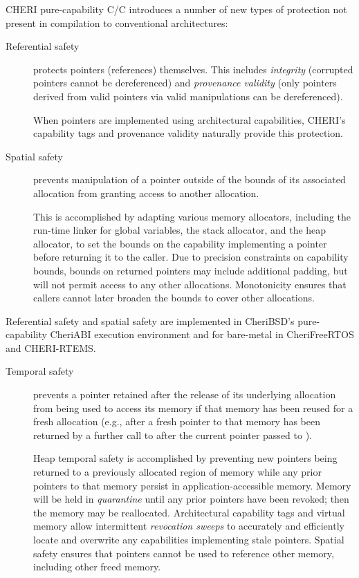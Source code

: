 \documentclass[12pt,twoside,openright,usletter]{article}
\newcommand{\ccode}[1]{{\small\ttfamily{#1}}}
\newcommand{\cfunc}[1]{{\ccode{#1()}}}
\newcommand*{\cpp}[1][]{C\textsmaller[2]{\nolinebreak[4]\hspace{-.05em}\raisebox{.45ex}{\textbf{++}}}}
\newcommand*{\purecapCOrCpp}[1]{CHERI pure-capability C/\cpp{}}
\begin{document}
\purecapCOrCpp{} introduces a number of new types of protection not
present in compilation to conventional architectures:

\begin{description}
\item[Referential safety] protects pointers (references) themselves.
  This includes \textit{integrity} (corrupted pointers cannot be dereferenced)
  and \textit{provenance validity} (only pointers derived from valid pointers
  via valid manipulations can be dereferenced).

  When pointers are implemented using architectural capabilities, CHERI's
  capability tags and provenance validity naturally provide this protection.

\item[Spatial safety] prevents manipulation of a pointer outside of the bounds
  of its associated allocation from granting access to another allocation.

  This is accomplished by adapting various memory allocators, including the run-time
  linker for global variables, the stack allocator, and the heap allocator,
  to set the bounds on the capability implementing a pointer before returning
  it to the caller.
  Due to precision constraints on capability bounds, bounds on returned
  pointers may include additional padding, but will not permit access to any
  other allocations.
  Monotonicity ensures that callers cannot later broaden the bounds to cover
  other allocations.
\end{description}

\noindent
Referential safety and spatial safety are implemented in CheriBSD's
pure-capability CheriABI execution environment and for bare-metal in
CheriFreeRTOS and CHERI-RTEMS.

\begin{description}
\item[Temporal safety] prevents a pointer retained after the release of its
  underlying allocation from being used to access its memory if that memory
  has been reused for a fresh allocation (e.g., after a fresh pointer to that
  memory has been returned by a further call to \cfunc{malloc} after the
  current pointer passed to \cfunc{free}).

  Heap temporal safety is accomplished by preventing new pointers being
  returned to a previously allocated region of memory while any prior pointers
  to that memory persist in application-accessible memory.
  Memory will be held in \textit{quarantine} until any prior pointers have
  been revoked; then the memory may be reallocated.
  Architectural capability tags and virtual memory allow intermittent
  \textit{revocation sweeps} to accurately and efficiently locate and
  overwrite any capabilities implementing stale pointers.
  Spatial safety ensures that pointers cannot be used to reference other
  memory, including other freed memory.
\end{description}
\end{document}

